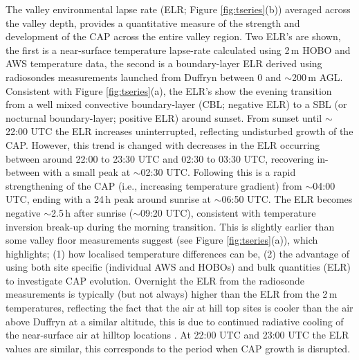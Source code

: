 \documentclass[times]{qjrms4}
\begin{document}
The valley environmental lapse rate (ELR; Figure \ref{fig:tseries}(b)) averaged across the valley depth, provides a quantitative measure of the strength and development of the CAP across the entire valley region. Two ELR's are shown, the first is a near-surface temperature lapse-rate calculated using 2$\,\mbox{m}$ HOBO and AWS temperature data, the second is a boundary-layer ELR derived using radiosondes measurements launched from Duffryn between 0 and $\sim$200$\,\mbox{m}$ AGL. Consistent with Figure \ref{fig:tseries}(a), the ELR's show the evening transition from a well mixed convective boundary-layer (CBL; negative ELR) to a SBL (or nocturnal boundary-layer; positive ELR) around sunset. From sunset until $\sim$22:00 UTC the ELR increases uninterrupted, reflecting undisturbed growth of the CAP. However, this trend is changed with decreases in the ELR occurring between around 22:00 to 23:30 UTC and 02:30 to 03:30 UTC, recovering in-between with a small peak at $\sim$02:30 UTC. Following this is a rapid strengthening of the CAP (i.e., increasing temperature gradient) from $\sim$04:00 UTC, ending with a 24$\,\mbox{h}$ peak around sunrise at $\sim$06:50 UTC. The ELR becomes negative $\sim$2.5$\,\mbox{h}$ after sunrise ($\sim$09:20 UTC), consistent with temperature inversion break-up during the morning transition. This is slightly earlier than some valley floor measurements suggest (see Figure \ref{fig:tseries}(a)), which highlights; (1) how localised temperature differences can be, (2) the advantage of using both site specific (individual AWS and HOBOs) and bulk quantities (ELR) to investigate CAP evolution. Overnight the ELR from the radiosonde measurements is typically (but not always) higher than the ELR from the 2$\,\mbox{m}$ temperatures, reflecting the fact that the air at hill top sites is cooler than the air above Duffryn at a similar altitude, this is due to continued radiative cooling of the near-surface air at hilltop locations \citep{Vosper2013narrow}. At 22:00 UTC and 23:00 UTC the ELR values are similar, this corresponds to the period when CAP growth is disrupted.
\end{document}
